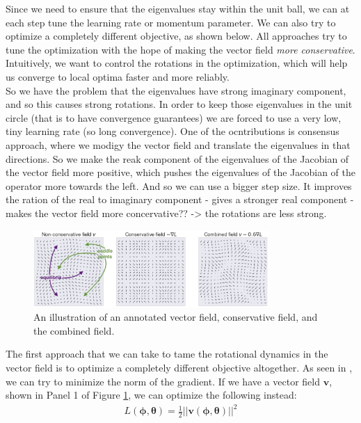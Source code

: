 \documentclass{article}
\renewcommand{\vec}[1]{\ensuremath{\boldsymbol{#1}}}
\begin{document}
Since we need to ensure that the eigenvalues stay within the unit ball, we can at each step tune the learning rate or momentum parameter. We can also try to optimize a completely different objective, as shown below. All approaches try to tune the optimization with the hope of making the vector field \textit{more conservative}. Intuitively, we want to control the rotations in the optimization, which will help us converge to local optima faster and more reliably.
\\
So we have the problem that the eigenvalues have strong imaginary component, and so this causes strong rotations. In order to keep those eigenvalues in the unit circle (that is to have convergence guarantees) we are forced to use a very low, tiny learning rate (so long convergence). One of the ocntributions is consensus approach, where we modigy the vector field and translate the eigenvalues in that directions. So we make the reak component of the eigenvalues of the Jacobian of the vector field more positive, which pushes the eigenvalues of the Jacobian of the operator more towards the left. And so we can use a bigger step size. It improves the ration of the real to imaginary component - gives a stronger real component - makes the vector field more concervative?? -> the rotations are less strong.

\begin{figure}[h!]
    \centering
    \includegraphics[width=0.8\textwidth]{vectorfieldnog17.png}
    \caption{An illustration of an annotated vector field, conservative field, and the combined field.}
    \label{fig:vfnog}
\end{figure}

The first approach that we can take to tame the rotational dynamics in the vector field is to optimize a completely different objective altogether. As seen in \cite{MeschederNG17a}, we can try to minimize the norm of the gradient. If we have a vector field $\vec{v}$, shown in Panel 1 of Figure \ref{fig:vfnog}, we can optimize the following instead:
\begin{align}
    L(\vec{\phi}, \vec{\theta}) = \frac{1}{2}||\vec{v}(\vec{\phi}, \vec{\theta})||^2
\end{align}
\end{document}
